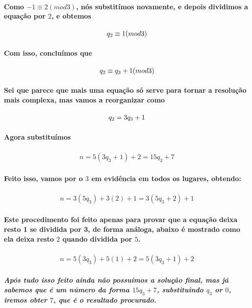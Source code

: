 \paragraph{
Como $-1 \equiv 2 (mod 3)$, n\'os substit\'imos novamente, e depois dividimos a equa\c{c}\~ao por $2$, e obtemos
}
\[	
	\begin{array}{c}
		\textit{$ q_2  \equiv 1 (mod 3)$}
	\end{array}
\]
\paragraph{
Com isso, conclu\'imos que
}
\[	
	\begin{array}{c}
		\textit{$ q_2  \equiv q_3 + 1 (mod 3)$}
	\end{array}
\]
\paragraph{
Sei que parece que mais uma equa\c{c}\~ao s\'o serve para tornar a resolu\c{c}\~ao mais complexa, mas vamos a reorganizar como
}
\[	
	\begin{array}{c}
		\textit{$ q_2 = 3q_3 + 1 $}
	\end{array}
\]
\paragraph{
Agora substitu\'imos
}
\[	
	\begin{array}{c}
		\textit{$n = 5(3q_3 + 1) + 2 = 15q_3 +7$}
	\end{array}
\]
\paragraph{
Feito isso, vamos por o $3$ em evid\^encia em todos os lugares, obtendo:
}
\[	
	\begin{array}{c}
		\textit{$n = 3(5q_3) +3(2) +1 = 3(5q_3 +2)+1$}
	\end{array}
\]
\paragraph{
Este procedimento foi feito apenas para provar que a equa\c{c}\~ao deixa resto 1 se dividida por 3, de forma an\'aloga, abaixo \'e mostrado como ela deixa resto $2$ quando dividida por $5$.
}
\[	
	\begin{array}{c}
		\textit{$n = 5(3q_3) +5(1) +2 = 5(3q_3 +1)+2$}
	\end{array}
\]
\subparagraph{
Ap\'os tudo isso feito ainda n\~ao possu\'imos a solu\c{c}\~ao final, mas j\'a sabemos que \'e um n\'umero da forma $15q_3 + 7$, substituindo $q_3$ or $0$, iremos obter $7$, que \'e o resultado procurado.
}


